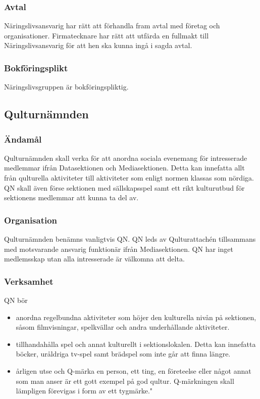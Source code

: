 \documentclass{dgovdoc}
\begin{document}
\subsubsection{Avtal}

Näringslivsansvarig har rätt att förhandla fram avtal med företag och
organisationer. Firmatecknare har rätt att utfärda en fullmakt till Näringslivsansvarig för att hen ska kunna ingå i sagda avtal.

\subsubsection{Bokföringsplikt}
Näringslivsgruppen är bokföringspliktig.

\subsection{Qulturnämnden}

\subsubsection{Ändamål}

Qulturnämnden skall verka för att anordna sociala evenemang för intresserade medlemmar ifrån Datasektionen och Mediasektionen. Detta kan innefatta allt från qulturella aktiviteter till aktiviteter som enligt normen klassas som nördiga. QN skall även förse sektionen med sällskapsspel samt ett rikt kulturutbud för sektionens medlemmar att kunna ta del av.

\subsubsection{Organisation}

Qulturnämnden benämns vanligtvis QN. QN leds av Qulturattachén tillsammans med motsvarande ansvarig funktionär ifrån Mediasektionen. QN har inget medlemsskap utan alla intresserade är välkomna att delta.

\subsubsection{Verksamhet}

QN bör
\begin{itemize}
  \item anordna regelbundna aktiviteter som höjer den kulturella nivån på sektionen, såsom filmvisningar, spelkvällar och andra underhållande aktiviteter.
  \item tillhandahålla spel och annat kulturellt i sektionslokalen. Detta kan innefatta böcker, uråldriga tv-spel samt brädspel som inte går att finna längre.
  \item årligen utse och Q-märka en person, ett ting, en företeelse eller något annat som man anser är ett gott exempel på god qultur. Q-märkningen skall lämpligen förevigas i form av ett tygmärke."
\end{itemize}
\end{document}
